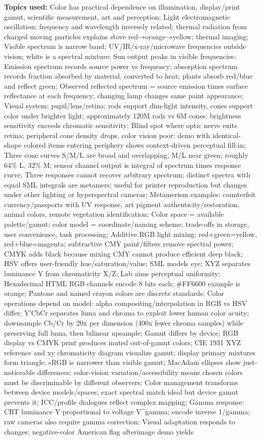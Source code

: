 \textbf{Topics used:} Color has practical dependence on illumination, display/print gamut, scientific measurement, art and perception; Light electromagnetic oscillation; frequency and wavelength inversely related; thermal radiation from charged moving particles explains stove red→orange→yellow; thermal imaging; Visible spectrum is narrow band; UV/IR/x-ray/microwave frequencies outside vision; white is a spectral mixture; Sun output peaks in visible frequencies; Emission spectrum records source power vs frequency; absorption spectrum records fraction absorbed by material, converted to heat; plants absorb red/blue and reflect green; Observed reflected spectrum = source emission times surface reflectance at each frequency; changing lamp changes same paint appearance; Visual system: pupil/lens/retina; rods support dim-light intensity, cones support color under brighter light; approximately 120M rods vs 6M cones; brightness sensitivity exceeds chromatic sensitivity; Blind spot where optic nerve exits retina; peripheral cone density drops, color vision poor; demo with identical-shape colored items entering periphery shows context-driven perceptual fill-in; Three cone curves S/M/L are broad and overlapping, M/L near green; roughly 64\% L, 32\% M; sensor channel output is integral of spectrum times response curve; Three responses cannot recover arbitrary spectrum; distinct spectra with equal SML integrals are metamers; useful for printer reproduction but changes under other lighting or hyperspectral cameras; Metamerism examples: counterfeit currency/passports with UV response, art pigment authenticity/restoration, animal colors, remote vegetation identification; Color space = available palette/gamut; color model = coordinate/naming scheme; trade-offs in storage, user convenience, task processing; Additive RGB light mixing: red+green=yellow, red+blue=magenta; subtractive CMY paint/filters remove spectral power; CMYK adds black because mixing CMY cannot produce efficient deep black; HSV offers user-friendly hue/saturation/value; SML models eye; XYZ separates luminance Y from chromaticity X/Z; Lab aims perceptual uniformity; Hexadecimal HTML RGB channels encode 8 bits each; \#FF6600 example is orange; Pantone and named crayon colors are discrete standards; Color operations depend on model: alpha compositing/interpolation in RGB vs HSV differ; Y′CbCr separates luma and chroma to exploit lower human color acuity; downsample Cb/Cr by 20x per dimension (400x fewer chroma samples) while preserving full luma, then bilinear upsample; Gamut differs by device; RGB display vs CMYK print produces muted out-of-gamut colors; CIE 1931 XYZ reference and xy chromaticity diagram visualize gamut; display primary mixtures form triangle; sRGB is narrower than visible gamut; MacAdam ellipses show just-noticeable differences; color-vision variation/accessibility means chosen colors must be discriminable by different observers; Color management transforms between device models/spaces; exact spectral match ideal but device gamut prevents it; ICC/profile dialogues reflect complex mapping; Gamma response: CRT luminance Y proportional to voltage V\^{}gamma; encode inverse 1/gamma; raw cameras also require gamma correction; Visual adaptation responds to changes; negative-color American flag afterimage demo yields 